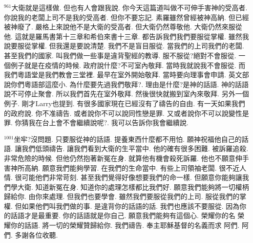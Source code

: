 \documentclass{book}
\begin{document}
$^{961}$大衛就是這樣做.
但也有人會跟我說.
你今天這篇道叫做不可伸手害神的受高者.
你說我的老闆上司不是我的受高者.
但你不要忘記.
素羅雖然曾經被神高納.
但已經被神廢了.
嚴格上來說他不是大衛的受高者.
但大衛仍然尊敬他.
大衛仍然來服從他.
這就是羅馬書第十三章和希伯來書十三章.
都告訴我們我們要服從掌權.
雖然我說要服從掌權.
但我還是要說清楚.
我們不是盲目服從.
當我們的上司我們的老闆.
甚至我們的國家.
叫我們做一些事是違背聖經的教導.
服不服從?絕對不會服從.
一個例子就是在疫情的時候.
政府說什麼?不可室內敬拜.
當時我就說我不會服從.
而我們粵語堂是我們教會三堂裡.
最早在室外開始敬拜.
當時要向理事會申請.
英文部說你們粵語部這麼小.
為什麼要先過我們敬拜?.
理由是什麼?是神的話語.
神的話語說不可停止聚會.
所以我們首先在室外敬拜.
然後很快就搬到室內來敬拜.
另外一個例子.
剛才Larry也提到.
有很多國家現在已經沒有了禱告的自由.
有一天如果我們的政府說.
你不准禱告.
或者說你不可以說同性戀是罪.
又或者說你不可以說變性是罪.
你猜我在台上會不會繼續說呢?.
我可以告訴你我會繼續說.

$^{1001}$坐牢?沒問題.
只要服從神的話語.
提養東西什麼都不用怕.
願神祝福他自己的話語.
讓我們低頭禱告.
讓我們看到大衛的生平當中.
他的確有很多困難.
被訴羅追殺.
非常危險的時候.
但他仍然抱著新冤在身.
就算他有機會殺死訴羅.
他也不願意伸手害神所高納.
願意我們能夠學習.
在我們的生命當中.
有些上司領袖老闆.
很不近人情.
很可能他們非常苛刻.
甚至我們覺得好像想要我們的命一樣.
但願意你能夠讓我們學大衛.
知道新冤在身.
知道你的處理怎樣都比我們好.
願意我們能夠將一切權柄歸給你.
由你來處理.
但我們也要學會.
雖然我們要服從我們的上司.
服從我們的掌權.
但如果他們叫我們做的事.
是違背你的話語的話.
我們也應該不要服從.
因為你的話語才是最重要.
你的話語就是你自己.
願意我們能夠有這個心.
榮耀你的名 榮耀你的話語.
將一切的榮耀贊歸給你.
我們禱告.
奉主耶穌基督的名義而求 阿們.
阿們.
多謝各位收聽.
\newpage
\end{document}
